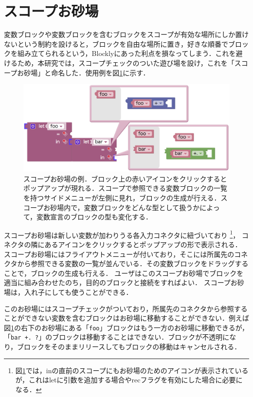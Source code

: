 \section {スコープお砂場}

変数ブロックや変数ブロックを含むブロックをスコープが有効な場所にしか置けないという制約を設けると，ブロックを自由な場所に置き，好きな順番でブロックを組み立てられるという，Blocklyにあった利点を損なってしまう．これを避けるため，本研究では，スコープチェックのついた遊び場を設け，これを「スコープお砂場」と命名した．使用例を図\ref{fig:osunaba}に示す．

\begin{figure}[H]
 \centering
 \includegraphics[keepaspectratio, scale=0.3]{img/osunaba3.png}
 \caption{スコープお砂場の例．ブロック上の赤いアイコンをクリックするとポップアップが現れる．スコープで参照できる変数ブロックの一覧を持つサイドメニューが左側に見れ，ブロックの生成が行える．スコープお砂場内で，変数ブロックをどんな型として扱うかによって，変数宣言のブロックの型も変化する．\label{fig:osunaba}}
\end{figure}

スコープお砂場は新しい変数が加わりうる各入力コネクタに紐づいており
\footnote[2]{図\ref{fig:osunaba}では，inの直前のスコープにもお砂場のためのアイコンが表示されているが，これはletに引数を追加する場合やrecフラグを有効にした場合に必要になる．}，
コネクタの隣にあるアイコンをクリックするとポップアップの形で表示される．
スコープお砂場にはフライアウトメニューが付いており，そこには所属先のコネクタから参照できる変数の一覧が並んでいる．その変数ブロックをドラッグすることで，ブロックの生成も行える．
ユーザはこのスコープお砂場でブロックを適当に組み合わせたのち，目的のブロックと接続をすればよい．
スコープお砂場は，入れ子にしても使うことができる．

このお砂場にはスコープチェックがついており，所属先のコネクタから参照することができない変数を含むブロックはお砂場に移動することができない．例えば図\ref{fig:osunaba}の右下のお砂場にある「{\tt foo}」ブロックはもう一方のお砂場に移動できるが，「{\tt bar +.\ ?}」のブロックは移動することはできない．ブロックが不透明になり，ブロックをそのままリリースしてもブロックの移動はキャンセルされる．

